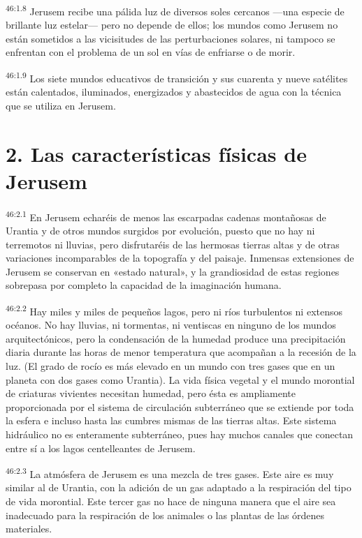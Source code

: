 \par
\textsuperscript{46:1.8} Jerusem recibe una pálida luz de diversos soles cercanos ---una especie de brillante luz estelar--- pero no depende de ellos; los mundos como Jerusem no están sometidos a las vicisitudes de las perturbaciones solares, ni tampoco se enfrentan con el problema de un sol en vías de enfriarse o de morir.

\par
\textsuperscript{46:1.9} Los siete mundos educativos de transición y sus cuarenta y nueve satélites están calentados, iluminados, energizados y abastecidos de agua con la técnica que se utiliza en Jerusem.

\section*{2. Las características físicas de Jerusem}
\par
\textsuperscript{46:2.1} En Jerusem echaréis de menos las escarpadas cadenas montañosas de Urantia y de otros mundos surgidos por evolución, puesto que no hay ni terremotos ni lluvias, pero disfrutaréis de las hermosas tierras altas y de otras variaciones incomparables de la topografía y del paisaje. Inmensas extensiones de Jerusem se conservan en «estado natural», y la grandiosidad de estas regiones sobrepasa por completo la capacidad de la imaginación humana.

\par
\textsuperscript{46:2.2} Hay miles y miles de pequeños lagos, pero ni ríos turbulentos ni extensos océanos. No hay lluvias, ni tormentas, ni ventiscas en ninguno de los mundos arquitectónicos, pero la condensación de la humedad produce una precipitación diaria durante las horas de menor temperatura que acompañan a la recesión de la luz. (El grado de rocío es más elevado en un mundo con tres gases que en un planeta con dos gases como Urantia). La vida física vegetal y el mundo morontial de criaturas vivientes necesitan humedad, pero ésta es ampliamente proporcionada por el sistema de circulación subterráneo que se extiende por toda la esfera e incluso hasta las cumbres mismas de las tierras altas. Este sistema hidráulico no es enteramente subterráneo, pues hay muchos canales que conectan entre sí a los lagos centelleantes de Jerusem.

\par
\textsuperscript{46:2.3} La atmósfera de Jerusem es una mezcla de tres gases. Este aire es muy similar al de Urantia, con la adición de un gas adaptado a la respiración del tipo de vida morontial. Este tercer gas no hace de ninguna manera que el aire sea inadecuado para la respiración de los animales o las plantas de las órdenes materiales.

